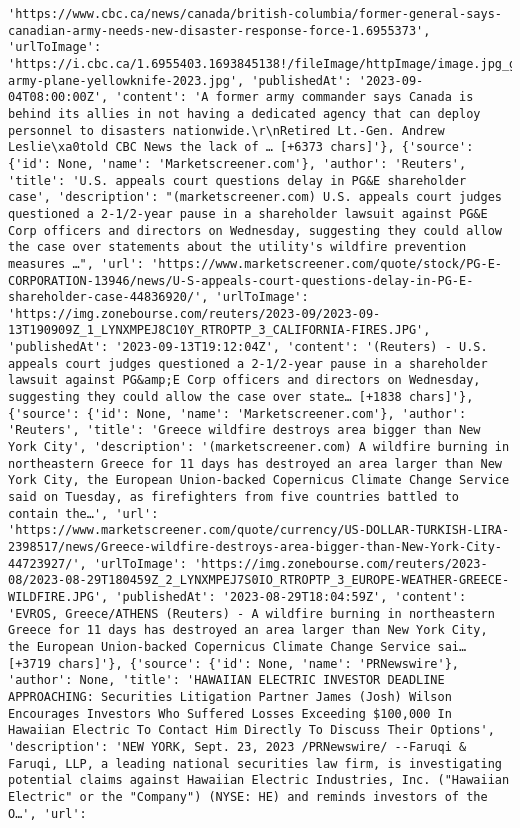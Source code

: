 \documentclass[
  letterpaper,
  DIV=11,
  numbers=noendperiod]{scrartcl}
\begin{document}
\begin{verbatim}
'https://www.cbc.ca/news/canada/british-columbia/former-general-says-canadian-army-needs-new-disaster-response-force-1.6955373', 'urlToImage': 'https://i.cbc.ca/1.6955403.1693845138!/fileImage/httpImage/image.jpg_gen/derivatives/16x9_620/canada-army-plane-yellowknife-2023.jpg', 'publishedAt': '2023-09-04T08:00:00Z', 'content': 'A former army commander says Canada is behind its allies in not having a dedicated agency that can deploy personnel to disasters nationwide.\r\nRetired Lt.-Gen. Andrew Leslie\xa0told CBC News the lack of … [+6373 chars]'}, {'source': {'id': None, 'name': 'Marketscreener.com'}, 'author': 'Reuters', 'title': 'U.S. appeals court questions delay in PG&E shareholder case', 'description': "(marketscreener.com) U.S. appeals court judges questioned a 2-1/2-year pause in a shareholder lawsuit against PG&E Corp officers and directors on Wednesday, suggesting they could allow the case over statements about the utility's wildfire prevention measures …", 'url': 'https://www.marketscreener.com/quote/stock/PG-E-CORPORATION-13946/news/U-S-appeals-court-questions-delay-in-PG-E-shareholder-case-44836920/', 'urlToImage': 'https://img.zonebourse.com/reuters/2023-09/2023-09-13T190909Z_1_LYNXMPEJ8C10Y_RTROPTP_3_CALIFORNIA-FIRES.JPG', 'publishedAt': '2023-09-13T19:12:04Z', 'content': '(Reuters) - U.S. appeals court judges questioned a 2-1/2-year pause in a shareholder lawsuit against PG&amp;E Corp officers and directors on Wednesday, suggesting they could allow the case over state… [+1838 chars]'}, {'source': {'id': None, 'name': 'Marketscreener.com'}, 'author': 'Reuters', 'title': 'Greece wildfire destroys area bigger than New York City', 'description': '(marketscreener.com) A wildfire burning in northeastern Greece for 11 days has destroyed an area larger than New York City, the European Union-backed Copernicus Climate Change Service said on Tuesday, as firefighters from five countries battled to contain the…', 'url': 'https://www.marketscreener.com/quote/currency/US-DOLLAR-TURKISH-LIRA-2398517/news/Greece-wildfire-destroys-area-bigger-than-New-York-City-44723927/', 'urlToImage': 'https://img.zonebourse.com/reuters/2023-08/2023-08-29T180459Z_2_LYNXMPEJ7S0IO_RTROPTP_3_EUROPE-WEATHER-GREECE-WILDFIRE.JPG', 'publishedAt': '2023-08-29T18:04:59Z', 'content': 'EVROS, Greece/ATHENS (Reuters) - A wildfire burning in northeastern Greece for 11 days has destroyed an area larger than New York City, the European Union-backed Copernicus Climate Change Service sai… [+3719 chars]'}, {'source': {'id': None, 'name': 'PRNewswire'}, 'author': None, 'title': 'HAWAIIAN ELECTRIC INVESTOR DEADLINE APPROACHING: Securities Litigation Partner James (Josh) Wilson Encourages Investors Who Suffered Losses Exceeding $100,000 In Hawaiian Electric To Contact Him Directly To Discuss Their Options', 'description': 'NEW YORK, Sept. 23, 2023 /PRNewswire/ --Faruqi & Faruqi, LLP, a leading national securities law firm, is investigating potential claims against Hawaiian Electric Industries, Inc. ("Hawaiian Electric" or the "Company") (NYSE: HE) and reminds investors of the O…', 'url': 
\end{verbatim}
\end{document}
